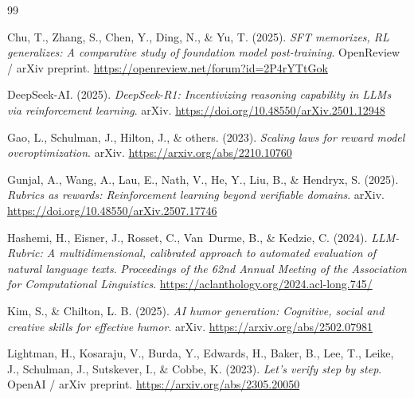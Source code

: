 \documentclass[14pt,a4paper]{extreport}
\begin{document}
\begin{thebibliography}{99}

  Chu, T., Zhang, S., Chen, Y., Ding, N., \& Yu, T. (2025). \textit{SFT memorizes, RL generalizes: A comparative study of foundation model post-training}. OpenReview / arXiv preprint. \href{https://openreview.net/forum?id=2P4rYTtGok}{https://openreview.net/forum?id=2P4rYTtGok}

  DeepSeek-AI. (2025). \textit{DeepSeek-R1: Incentivizing reasoning capability in LLMs via reinforcement learning}. arXiv. \href{https://doi.org/10.48550/arXiv.2501.12948}{https://doi.org/10.48550/arXiv.2501.12948}

  Gao, L., Schulman, J., Hilton, J., \& others. (2023). \textit{Scaling laws for reward model overoptimization}. arXiv. \href{https://arxiv.org/abs/2210.10760}{https://arxiv.org/abs/2210.10760}

  Gunjal, A., Wang, A., Lau, E., Nath, V., He, Y., Liu, B., \& Hendryx, S. (2025). \textit{Rubrics as rewards: Reinforcement learning beyond verifiable domains}. arXiv. \href{https://doi.org/10.48550/arXiv.2507.17746}{https://doi.org/10.48550/arXiv.2507.17746}

  Hashemi, H., Eisner, J., Rosset, C., Van~Durme, B., \& Kedzie, C. (2024). \textit{LLM-Rubric: A multidimensional, calibrated approach to automated evaluation of natural language texts}. \textit{Proceedings of the 62nd Annual Meeting of the Association for Computational Linguistics}. \href{https://aclanthology.org/2024.acl-long.745/}{https://aclanthology.org/2024.acl-long.745/}

  Kim, S., \& Chilton, L. B. (2025). \textit{AI humor generation: Cognitive, social and creative skills for effective humor}. arXiv. \href{https://arxiv.org/abs/2502.07981}{https://arxiv.org/abs/2502.07981}

  Lightman, H., Kosaraju, V., Burda, Y., Edwards, H., Baker, B., Lee, T., Leike, J., Schulman, J., Sutskever, I., \& Cobbe, K. (2023). \textit{Let's verify step by step}. OpenAI / arXiv preprint. \href{https://arxiv.org/abs/2305.20050}{https://arxiv.org/abs/2305.20050}


\end{thebibliography}
\end{document}
